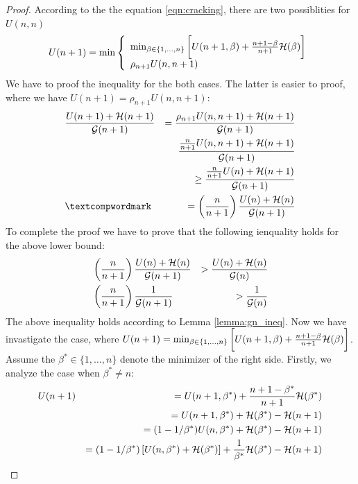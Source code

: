 \documentclass{article}
\newcommand{\bound}{{\cal H}}
\newcommand{\ERMbound}{{\cal G}}
\begin{document}
\begin{proof}
	According to the the equation \ref{eqn:cracking}, there are two possiblities
	for $U(n,n)$
	\begin{equation*} 
	U(n+1) = \min
\left\{
	\begin{array}{ll}
		\min_{\beta \in \{1,\ldots,n\}} \bigg[U(n+1,\beta) + \frac{n+1 - \beta}{n+1}
		\bound(\beta) \bigg]\\
		\rho_{n+1} U(n,n+1)
	\end{array}
\right.
\end{equation*}
We have to proof the inequality for the both cases. The latter is easier to
proof, where we have $U(n+1) = \rho_{n+1} U(n,n+1)$: 
\begin{eqnarray*}
	& \frac{U(n+1)+\bound(n+1)}{\ERMbound(n+1)} &  = 
	\frac{\rho_{n+1} U(n,n+1)+\bound(n+1)}{\ERMbound(n+1)}  \\
	& & \frac{\frac{n}{n+1} U(n,n+1)+\bound(n+1)}{\ERMbound(n+1)} \\ 
	& & \geq  \frac{\frac{n}{n+1} U(n)+\bound(n+1)}{\ERMbound(n+1)} \\
	&‌ & = \left( \frac{n}{n+1}\right) \frac{U(n)+\bound(n)}{\ERMbound(n+1)}
\end{eqnarray*}
To complete the proof we have to prove that the
following ienquality holds for the above lower bound: 
\begin{eqnarray*}
	& \left( \frac{n}{n+1}\right) \frac{U(n)+\bound(n)}{\ERMbound(n+1)} & > 
	\frac{U(n)+\bound(n)}{\ERMbound(n)} \\
	& \left( \frac{n}{n+1}\right) \frac{1}{\ERMbound(n+1)} & > 
	\frac{1}{\ERMbound(n)}
\end{eqnarray*}
The above inequality holds according to Lemma \ref{lemma:gn_ineq}. Now we have
invastigate the case, where $U(n+1) = \min_{\beta \in \{1,\ldots,n\}} \bigg[U(n+1,\beta) + \frac{n+1 - \beta}{n+1}
		\bound(\beta) \bigg]$. Assume the $\beta^*  \in \{1,\ldots,n\} $ denote the
		 minimizer of the right side. Firstly, we analyze the case when $\beta^* \neq
		 n $: 
\begin{eqnarray*}
	& U(n+1) & = U(n+1,\beta^*) + \frac{n+1 - \beta^*}{n+1}
		\bound(\beta^*) \\ 
		&  & = U(n+1,\beta^*) + \bound(\beta^*) - \bound(n+1) \\ 
		& & = (1-1/\beta^*) U(n,\beta^*) + \bound(\beta^*) - \bound(n+1) \\ 
		& & = (1-1/\beta^*) \left[ U(n,\beta^*) + \bound(\beta^*) \right] +
		\frac{1}{\beta^*} \bound(\beta^*) - \bound(n+1)
\end{eqnarray*} 

\end{proof}
\end{document}

